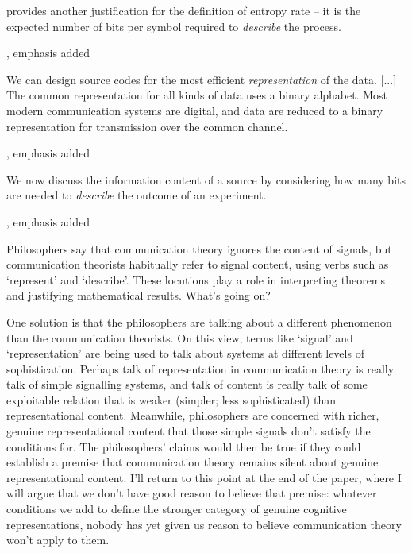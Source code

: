 \documentclass[12pt]{article}
\begin{document}
\begin{myquote}
 provides another justification for the definition of entropy rate -- it is the expected number of bits per symbol required to \textit{describe} the process.
\par\hspace*{\fill}\citet[115]{cover2006elements}, emphasis added
\end{myquote}

\begin{myquote}
We can design source codes for the most efficient \textit{representation} of the data. [...] The common representation for all kinds of data uses a binary alphabet. Most modern communication systems are digital, and data are reduced to a binary representation for transmission over the common channel.
\par\hspace*{\fill}\citet[218]{cover2006elements}, emphasis added
\end{myquote}

\begin{myquote}
We now discuss the information content of a source by considering how many bits are needed to \textit{describe} the outcome of an experiment.
\par\hspace*{\fill}\citet[73]{mackay2003information}, emphasis added
\end{myquote}

\noindent Philosophers say that communication theory ignores the content of signals, but communication theorists habitually refer to signal content, using verbs such as `represent' and `describe'.
These locutions play a role in interpreting theorems and justifying mathematical results.
What's going on?

One solution is that the philosophers are talking about a different phenomenon than the communication theorists.
On this view, terms like `signal' and `representation' are being used to talk about systems at different levels of sophistication.
Perhaps talk of representation in communication theory is really talk of simple signalling systems, and talk of content is really talk of some exploitable relation that is weaker (simpler; less sophisticated) than representational content.
Meanwhile, philosophers are concerned with richer, genuine representational content that those simple signals don't satisfy the conditions for.
The philosophers' claims would then be true if they could establish a premise that communication theory remains silent about genuine representational content.
I'll return to this point at the end of the paper, where I will argue that we don't have good reason to believe that premise: whatever conditions we add to define the stronger category of genuine cognitive representations, nobody has yet given us reason to believe communication theory won't apply to them.
\end{document}
